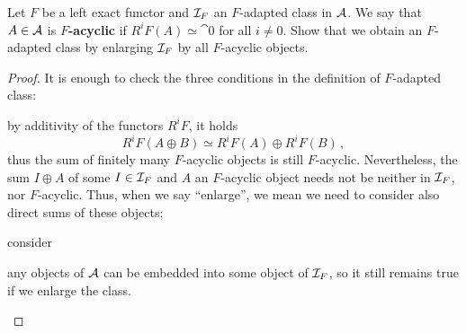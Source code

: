 \begin{exercise}
    Let $F$ be a left exact functor and $\mathcal{I}_{F}$ an $F$-adapted class in $\mathcal{A}$.
    We say that $A \in \mathcal{A}$ is \textbf{$F$-acyclic} if $R^{i}F(A) \simeq \cat{0}$
    for all $i \ne 0$. Show that we obtain an $F$-adapted class by
    enlarging $\mathcal{I}_{F}$ by all $F$-acyclic objects.
    \begin{proof}
        It is enough to check the three conditions in the definition of 
        $F$-adapted class:
        \begin{rmnumerate}
            \item by additivity of the functors $R^{i}F$, it holds
            \begin{equation*}
                R^{i}F(A \oplus B) \simeq R^{i}F(A) \oplus R^{i}F(B)\,,
            \end{equation*}
            thus the sum of finitely many $F$-acyclic objects is still $F$-acyclic.
            Nevertheless, the sum $I \oplus A$ of some $I \in \mathcal{I}_{F}$ 
            and $A$ an $F$-acyclic object needs not be neither in $\mathcal{I}_{F}$,
            nor $F$-acyclic. Thus, when we say ``enlarge'',
            we mean we need to consider also direct sums of these objects;

            \item consider 

            \item any objects of $\mathcal{A}$ can be embedded into some object of $\mathcal{I}_{F}$,
            so it still remains true if we enlarge the class.
        \end{rmnumerate}
    \end{proof}
\end{exercise}

